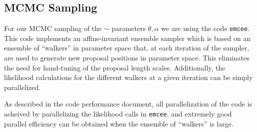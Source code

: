\documentclass[11pt,preprint]{aastex}
\begin{document}
\subsection{MCMC Sampling}
For our MCMC sampling of the $\sim$ parameters ${\theta, \alpha}$ we are using the code \texttt{emcee}.  
This code implements an affine-invariant ensemble sampler \citep{goodman_weare} which is based on an ensemble of ``walkers'' in parameter space that, at each iteration of the sampler, are used to generate new proposal positions in parameter space.  
This eliminates the need for hand-tuning of the proposal length scales.  
Additionally, the likelihood calculations for the different walkers at a given iteration can be simply parallelized.

As described in the code performance document, all parallelization of the code is acheived by parallelizing the likelihood calls in \texttt{emcee}, and extremely good parallel efficiency can be obtained when the ensemble of ``walkers'' is large.





\end{document}
